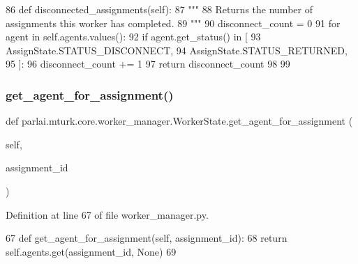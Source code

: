 \begin{DoxyCode}
86     \textcolor{keyword}{def }disconnected\_assignments(self):
87         \textcolor{stringliteral}{"""}
88 \textcolor{stringliteral}{        Returns the number of assignments this worker has completed.}
89 \textcolor{stringliteral}{        """}
90         disconnect\_count = 0
91         \textcolor{keywordflow}{for} agent \textcolor{keywordflow}{in} self.agents.values():
92             \textcolor{keywordflow}{if} agent.get\_status() \textcolor{keywordflow}{in} [
93                 AssignState.STATUS\_DISCONNECT,
94                 AssignState.STATUS\_RETURNED,
95             ]:
96                 disconnect\_count += 1
97         \textcolor{keywordflow}{return} disconnect\_count
98 
99 
\end{DoxyCode}
\mbox{\label{classparlai_1_1mturk_1_1core_1_1worker__manager_1_1WorkerState_ab258d81b68825e049f236cbb8352a126}} 
\subsubsection{\texorpdfstring{get\+\_\+agent\+\_\+for\+\_\+assignment()}{get\_agent\_for\_assignment()}}
{\footnotesize\ttfamily def parlai.\+mturk.\+core.\+worker\+\_\+manager.\+Worker\+State.\+get\+\_\+agent\+\_\+for\+\_\+assignment (\begin{DoxyParamCaption}\item[{}]{self,  }\item[{}]{assignment\+\_\+id }\end{DoxyParamCaption})}



Definition at line 67 of file worker\+\_\+manager.\+py.


\begin{DoxyCode}
67     \textcolor{keyword}{def }get\_agent\_for\_assignment(self, assignment\_id):
68         \textcolor{keywordflow}{return} self.agents.get(assignment\_id, \textcolor{keywordtype}{None})
69 
\end{DoxyCode}
\mbox{\label{classparlai_1_1mturk_1_1core_1_1worker__manager_1_1WorkerState_ac2dd663b0b95b39c915e8198d825b84c}} 
